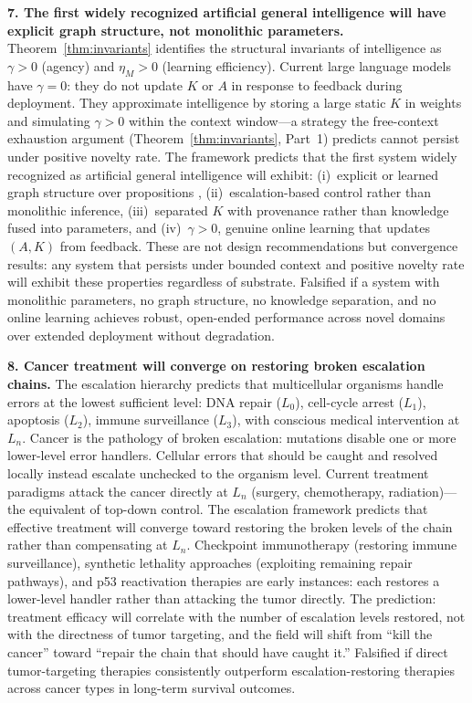 \documentclass[11pt]{article}
\theoremstyle{definition}
\theoremstyle{remark}
\begin{document}
\textbf{7. The first widely recognized artificial general intelligence
will have explicit graph structure, not monolithic parameters.}
Theorem~\ref{thm:invariants} identifies the structural invariants of
intelligence as $\gamma > 0$ (agency) and $\eta_M > 0$ (learning
efficiency). Current large language models have $\gamma = 0$: they do
not update $K$ or $A$ in response to feedback during deployment.
They approximate intelligence by storing a large static $K$ in weights
and simulating $\gamma > 0$ within the context window---a strategy
the free-context exhaustion argument
(Theorem~\ref{thm:invariants}, Part~1) predicts cannot persist under
positive novelty rate. The framework predicts that the first system
widely recognized as artificial general intelligence will exhibit:
(i)~explicit or learned graph structure over propositions
\cite{McCarthy2026a}, (ii)~escalation-based control
\cite{McCarthy2026c} rather than monolithic inference,
(iii)~separated $K$ with provenance rather than knowledge fused into
parameters, and (iv)~$\gamma > 0$, genuine online learning that
updates $(A, K)$ from feedback. These are not design recommendations
but convergence results: any system that persists under bounded context
and positive novelty rate will exhibit these properties regardless of
substrate. Falsified if a system with monolithic parameters, no graph
structure, no knowledge separation, and no online learning achieves
robust, open-ended performance across novel domains over extended
deployment without degradation.

\textbf{8. Cancer treatment will converge on restoring broken
escalation chains.}
The escalation hierarchy \cite{McCarthy2026c} predicts that
multicellular organisms handle errors at the lowest sufficient level:
DNA repair ($L_0$), cell-cycle arrest ($L_1$), apoptosis ($L_2$),
immune surveillance ($L_3$), with conscious medical intervention at
$L_n$. Cancer is the pathology of broken escalation: mutations disable
one or more lower-level error handlers. Cellular errors that should
be caught and resolved locally instead escalate unchecked to the
organism level. Current treatment paradigms attack the cancer
directly at $L_n$ (surgery, chemotherapy, radiation)---the equivalent
of top-down control. The escalation framework predicts that effective
treatment will converge toward restoring the broken levels of the
chain rather than compensating at $L_n$. Checkpoint immunotherapy
(restoring immune surveillance), synthetic lethality approaches
(exploiting remaining repair pathways), and p53 reactivation therapies
are early instances: each restores a lower-level handler rather than
attacking the tumor directly. The prediction: treatment efficacy will
correlate with the number of escalation levels restored, not with the
directness of tumor targeting, and the field will shift from
``kill the cancer'' toward ``repair the chain that should have caught
it.'' Falsified if direct tumor-targeting therapies consistently
outperform escalation-restoring therapies across cancer types in
long-term survival outcomes.
\end{document}
